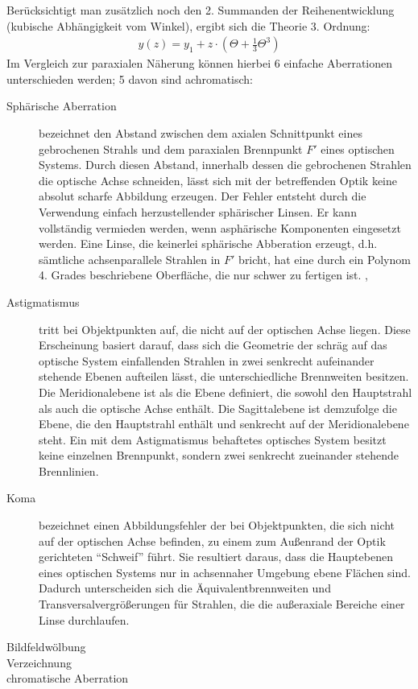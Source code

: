 Berücksichtigt man zusätzlich noch den 2. Summanden der Reihenentwicklung (kubische Abhängigkeit vom Winkel), ergibt sich die Theorie 3. Ordnung:
\begin{align*}
y(z)=y_1 + z \cdot \left( \Theta + \frac{1}{3}\Theta^3\right) 
\end{align*}
Im Vergleich zur paraxialen Näherung können hierbei 6 einfache Aberrationen unterschieden werden; 5 davon sind achromatisch:
\begin{description}
	\item[Sphärische Aberration] bezeichnet den Abstand zwischen dem axialen Schnittpunkt eines gebrochenen Strahls und dem paraxialen Brennpunkt $F'$ eines optischen Systems. Durch diesen Abstand, innerhalb dessen die gebrochenen Strahlen die optische Achse schneiden, lässt sich mit der betreffenden Optik keine absolut scharfe Abbildung erzeugen. Der Fehler entsteht durch die Verwendung einfach herzustellender sphärischer Linsen. Er kann vollständig vermieden werden, wenn asphärische Komponenten eingesetzt werden. Eine Linse, die keinerlei sphärische Abberation erzeugt, d.h. sämtliche achsenparallele Strahlen in $F'$ bricht, hat eine durch ein Polynom 4. Grades beschriebene Oberfläche, die nur schwer zu fertigen ist. \cite[416ff.]{hecht2014optik}, \cite[Vol. 1, 27-2ff.]{feynman2011flp}
	\item[Astigmatismus] tritt bei Objektpunkten auf, die nicht auf der optischen Achse liegen. Diese Erscheinung basiert darauf, dass sich die Geometrie der schräg auf das optische System einfallenden Strahlen in zwei senkrecht aufeinander stehende Ebenen aufteilen lässt, die unterschiedliche Brennweiten besitzen. Die Meridionalebene ist als die Ebene definiert, die sowohl den Hauptstrahl als auch die optische Achse enthält. Die Sagittalebene ist demzufolge die Ebene, die den Hauptstrahl enthält und senkrecht auf der Meridionalebene steht. Ein mit dem Astigmatismus behaftetes optisches System besitzt keine einzelnen Brennpunkt, sondern zwei senkrecht zueinander stehende Brennlinien. \cite[428ff.]{hecht2014optik}
	\item[Koma] bezeichnet einen Abbildungsfehler der bei Objektpunkten, die sich nicht auf der optischen Achse befinden, zu einem zum Außenrand der Optik gerichteten "`Schweif"' führt. Sie resultiert daraus, dass die Hauptebenen eines optischen Systems nur in achsennaher Umgebung ebene Flächen sind. Dadurch unterscheiden sich die Äquivalentbrennweiten und Transversalvergrößerungen für Strahlen, die die außeraxiale Bereiche einer Linse durchlaufen. \cite[423ff.]{hecht2014optik}
	\item[Bildfeldwölbung]
	\item[Verzeichnung]
	\item[chromatische Aberration]
\end{description}